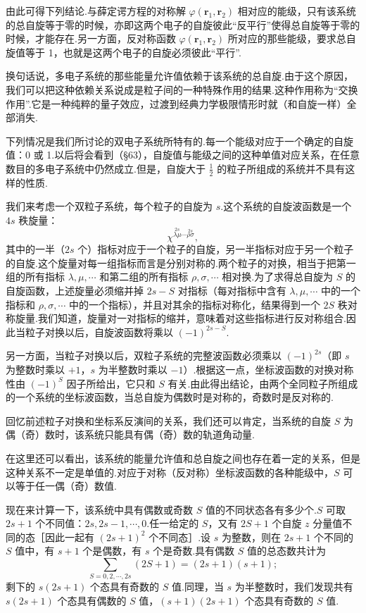 由此可得下列结论.与薛定谔方程的对称解 $\varphi(\boldsymbol{r}_1,\boldsymbol{r}_2)$ 相对应的能级，只有该系统的总自旋等于零的时候，亦即这两个电子的自旋彼此“反平行”使得总自旋等于零的时候，才能存在.另一方面，反对称函数 $\varphi(\boldsymbol{r}_1,\boldsymbol{r}_2)$ 所对应的那些能级，要求总自旋值等于 1，也就是这两个电子的自旋必须彼此“平行”.

换句话说，多电子系统的那些能量允许值依赖于该系统的总自旋.由于这个原因，我们可以把这种依赖关系说成是粒子间的一种特殊作用的结果.这种作用称为“交换作用”.它是一种纯粹的量子效应，过渡到经典力学极限情形时就（和自旋一样）全部消失.

下列情况是我们所讨论的双电子系统所特有的.每一个能级对应于一个确定的自旋值：0 或 1.以后将会看到（§63），自旋值与能级之间的这种单值对应关系，在任意数目的多电子系统中仍然成立.但是，自旋大于 $\frac{1}{2}$ 的粒子所组成的系统并不具有这样的性质.

我们来考虑一个双粒子系统，每个粒子的自旋为 $s$.这个系统的自旋波函数是一个 $4s$ 秩旋量：
\begin{equation*}
  \chi^{\overset{2s}{\lambda\mu}\cdots\overset{2s}{\rho\sigma}},
\end{equation*}
其中的一半（$2s$ 个）指标对应于一个粒子的自旋，另一半指标对应于另一个粒子的自旋.这个旋量对每一组指标而言是分别对称的.两个粒子的对换，相当于把第一组的所有指标 $\lambda,\mu,\cdots$ 和第二组的所有指标 $\rho,\sigma,\cdots$ 相对换.为了求得总自旋为 $S$ 的自旋函数，上述旋量必须缩并掉 $2s-S$ 对指标（每对指标中含有 $\lambda,\mu,\cdots$ 中的一个指标和 $\rho,\sigma,\cdots$ 中的一个指标），并且对其余的指标对称化，结果得到一个 $2S$ 秩对称旋量.我们知道，旋量对一对指标的缩并，意味着对这些指标进行反对称组合.因此当粒子对换以后，自旋波函数将乘以 $(-1)^{2s-S}$.

另一方面，当粒子对换以后，双粒子系统的完整波函数必须乘以 $(-1)^{2s}$（即 $s$ 为整数时乘以 $+1$，$s$ 为半整数时乘以 $-1$）.根据这一点，坐标波函数的对换对称性由 $(-1)^S$ 因子所给出，它只和 $S$ 有关.由此得出结论，由两个全同粒子所组成的一个系统的坐标波函数，当总自旋为偶数时是对称的，奇数时是反对称的.

回忆前述粒子对换和坐标系反演间的关系，我们还可以肯定，当系统的自旋 $S$ 为偶（奇）数时，该系统只能具有偶（奇）数的轨道角动量.

在这里还可以看出，该系统的能量允许值和总自旋之间也存在着一定的关系，但是这种关系不一定是单值的.对应于对称（反对称）坐标波函数的各种能级中，$S$ 可以等于任一偶（奇）数值.

现在来计算一下，该系统中具有偶数或奇数 $S$ 值的不同状态各有多少个.$S$ 可取 $2s+1$ 个不同值：$2s,2s-1,\cdots,0$.任一给定的 $S$，又有 $2S+1$ 个自旋 $z$ 分量值不同的态［因此一起有 $(2s+1)^2$ 个不同态］.设 $s$ 为整数，则在 $2s+1$ 个不同的 $S$ 值中，有 $s+1$ 个是偶数，有 $s$ 个是奇数.具有偶数 $S$ 值的总态数共计为
\begin{equation*}
  \sum_{S=0,2,\cdots,2s}\left(2S+1\right)=\left(2s+1\right)\left(s+1\right);
\end{equation*}
剩下的 $s(2s+1)$ 个态具有奇数的 $S$ 值.同理，当 $s$ 为半整数时，我们发现共有 $s(2s+1)$ 个态具有偶数的 $S$ 值，$(s+1)(2s+1)$ 个态具有奇数的 $S$ 值.


